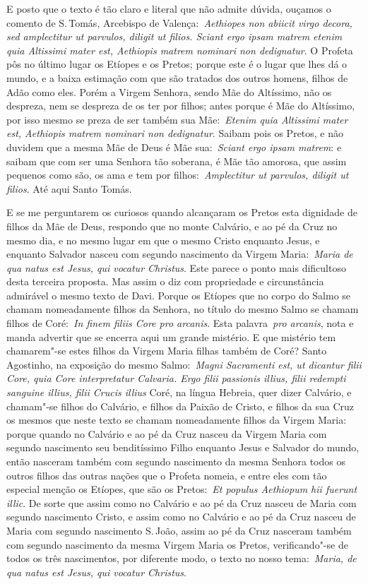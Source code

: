 E posto que o texto é tão claro e literal que não admite
dúvida, ouçamos o comento de S.\,Tomás, Arcebispo de
Valença:~\emph{Aethiopes non abiicit virgo decora, sed amplectitur ut
parvulos, diligit ut filios. Sciant ergo ipsam matrem etenim quia
Altissimi mater est, Aethiopis matrem nominari non dedignatur}. O
Profeta pôs no último lugar os Etíopes e os Pretos; porque este é o
lugar que lhes dá o mundo, e a baixa estimação com que são tratados dos
outros homens, filhos de Adão como eles. Porém a Virgem Senhora, sendo
Mãe do Altíssimo, não os despreza, nem se despreza de os ter por filhos;
antes porque é Mãe do Altíssimo, por isso mesmo se preza de ser também
sua Mãe:~\emph{Etenim quia Altissimi mater est, Aethiopis matrem
nominari non dedignatur}. Saibam pois os Pretos, e não duvidem que a
mesma Mãe de Deus é Mãe sua:~\emph{Sciant ergo ipsam matrem}: e saibam
que com ser uma Senhora tão soberana, é Mãe tão amorosa, que assim
pequenos como são, os ama e tem por filhos:~\emph{Amplectitur ut
parvulos, diligit ut filios}. Até aqui Santo Tomás.

E se me perguntarem os curiosos quando alcançaram os Pretos
esta dignidade de filhos da Mãe de Deus, respondo que no monte Calvário,
e ao pé da Cruz no mesmo dia, e no mesmo lugar em que o mesmo Cristo
enquanto Jesus, e enquanto Salvador nasceu com segundo nascimento da
Virgem Maria:~\emph{Maria de qua natus est Jesus, qui vocatur Christus}.
Este parece o ponto mais dificultoso desta terceira proposta. Mas assim
o diz com propriedade e circunstância admirável o mesmo texto de Davi.
Porque os Etíopes que no corpo do Salmo se chamam nomeadamente filhos da
Senhora, no título do mesmo Salmo se chamam filhos de Coré:~\emph{In
finem filiis Core pro arcanis}. Esta palavra~\emph{pro arcanis}, nota e
manda advertir que se encerra aqui um grande mistério. E que mistério
tem chamarem"-se estes filhos da Virgem Maria filhas também de Coré?
Santo Agostinho, na exposição do mesmo Salmo:~\emph{Magni Sacramenti
est, ut dicantur filii Core, quia Core interpretatur Calvaria. Ergo
filii passionis illius, filii redempti sanguine illius, filii Crucis
illius} Coré, na língua Hebreia, quer dizer Calvário,
e chamam"-se filhos do Calvário, e filhos da Paixão de Cristo, e filhos
da sua Cruz os mesmos que neste texto se chamam nomeadamente filhos da
Virgem Maria: porque quando no Calvário e ao pé da Cruz nasceu da Virgem
Maria com segundo nascimento seu benditíssimo Filho enquanto Jesus e
Salvador do mundo, então nasceram também com segundo nascimento da mesma
Senhora todos os outros filhos das outras nações que o Profeta nomeia, e
entre eles com tão especial menção os Etíopes, que são os
Pretos:~\emph{Et populus Aethiopum hii fuerunt illic}. De sorte que
assim como no Calvário e ao pé da Cruz nasceu de Maria com segundo
nascimento Cristo, e assim como no Calvário e ao pé da Cruz nasceu de
Maria com segundo nascimento S.\,João, assim ao pé da Cruz nasceram
também com segundo nascimento da mesma Virgem Maria os Pretos,
verificando"-se de todos os três nascimentos, por diferente modo, o texto
no nosso tema:~\emph{Maria, de qua natus est Jesus, qui vocatur
Christus}.


